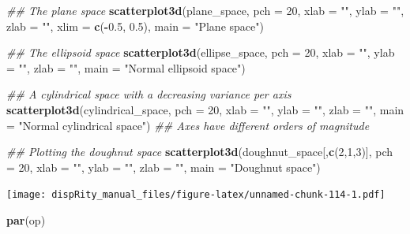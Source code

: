\documentclass[]{book}
\newenvironment{Shaded}{\begin{snugshade}}{\end{snugshade}}
\newcommand{\CommentTok}[1]{\textcolor[rgb]{0.56,0.35,0.01}{\textit{#1}}}
\newcommand{\DataTypeTok}[1]{\textcolor[rgb]{0.13,0.29,0.53}{#1}}
\newcommand{\DecValTok}[1]{\textcolor[rgb]{0.00,0.00,0.81}{#1}}
\newcommand{\FloatTok}[1]{\textcolor[rgb]{0.00,0.00,0.81}{#1}}
\newcommand{\KeywordTok}[1]{\textcolor[rgb]{0.13,0.29,0.53}{\textbf{#1}}}
\newcommand{\NormalTok}[1]{#1}
\newcommand{\OperatorTok}[1]{\textcolor[rgb]{0.81,0.36,0.00}{\textbf{#1}}}
\newcommand{\StringTok}[1]{\textcolor[rgb]{0.31,0.60,0.02}{#1}}
\begin{document}
\begin{Shaded}
\begin{Highlighting}[]
\CommentTok{## The plane space}
\KeywordTok{scatterplot3d}\NormalTok{(plane_space, }\DataTypeTok{pch =} \DecValTok{20}\NormalTok{, }\DataTypeTok{xlab =} \StringTok{""}\NormalTok{, }\DataTypeTok{ylab =} \StringTok{""}\NormalTok{, }\DataTypeTok{zlab =} \StringTok{""}\NormalTok{,}
              \DataTypeTok{xlim =} \KeywordTok{c}\NormalTok{(}\OperatorTok{-}\FloatTok{0.5}\NormalTok{, }\FloatTok{0.5}\NormalTok{), }\DataTypeTok{main =} \StringTok{"Plane space"}\NormalTok{)}

\CommentTok{## The ellipsoid space}
\KeywordTok{scatterplot3d}\NormalTok{(ellipse_space, }\DataTypeTok{pch =} \DecValTok{20}\NormalTok{, }\DataTypeTok{xlab =} \StringTok{""}\NormalTok{, }\DataTypeTok{ylab =} \StringTok{""}\NormalTok{, }\DataTypeTok{zlab =} \StringTok{""}\NormalTok{,}
              \DataTypeTok{main =} \StringTok{"Normal ellipsoid space"}\NormalTok{)}

\CommentTok{## A cylindrical space with a decreasing variance per axis}
\KeywordTok{scatterplot3d}\NormalTok{(cylindrical_space, }\DataTypeTok{pch =} \DecValTok{20}\NormalTok{, }\DataTypeTok{xlab =} \StringTok{""}\NormalTok{, }\DataTypeTok{ylab =} \StringTok{""}\NormalTok{, }\DataTypeTok{zlab =} \StringTok{""}\NormalTok{,}
              \DataTypeTok{main =} \StringTok{"Normal cylindrical space"}\NormalTok{)}
\CommentTok{## Axes have different orders of magnitude}

\CommentTok{## Plotting the doughnut space}
\KeywordTok{scatterplot3d}\NormalTok{(doughnut_space[,}\KeywordTok{c}\NormalTok{(}\DecValTok{2}\NormalTok{,}\DecValTok{1}\NormalTok{,}\DecValTok{3}\NormalTok{)], }\DataTypeTok{pch =} \DecValTok{20}\NormalTok{, }\DataTypeTok{xlab =} \StringTok{""}\NormalTok{, }\DataTypeTok{ylab =} \StringTok{""}\NormalTok{,}
              \DataTypeTok{zlab =} \StringTok{""}\NormalTok{, }\DataTypeTok{main =} \StringTok{"Doughnut space"}\NormalTok{)}
\end{Highlighting}
\end{Shaded}

\texttt{[image: dispRity\_manual\_files/figure-latex/unnamed-chunk-114-1.pdf]}

\begin{Shaded}
\begin{Highlighting}[]
\KeywordTok{par}\NormalTok{(op)}
\end{Highlighting}
\end{Shaded}
\end{document}
